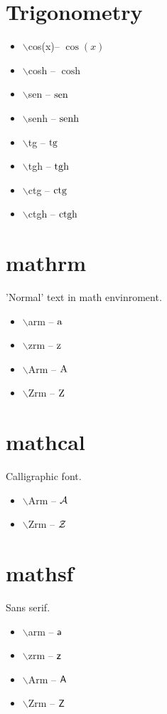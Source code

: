 \documentclass[twocolumn, a4paper]{article}
\begin{document}
	\section{Trigonometry}
	\begin{itemize}
		\item $\backslash$cos(x)-- $\cos(x)$ 
		\item $\backslash$cosh -- $\cosh$ 
		\item $\backslash$sen -- $\textrm{sen}$ 
		\item $\backslash$senh -- $\textrm{senh}$ 
		\item $\backslash$tg -- $\textrm{tg}$ 
		\item $\backslash$tgh -- $\textrm{tgh}$ 
		\item $\backslash$ctg -- $\textrm{ctg}$ 
		\item $\backslash$ctgh -- $\textrm{ctgh}$ 
	\end{itemize}
	
	\section{mathrm}
	'Normal' text in math envinroment.
	\begin{itemize}
		\item $\backslash$arm -- $\mathrm{a}$ 
		\item $\backslash$zrm -- $\mathrm{z}$ 
		\item $\backslash$Arm -- $\mathrm{A}$
		\item $\backslash$Zrm -- $\mathrm{Z}$  
	\end{itemize}
	
	\section{mathcal}
	Calligraphic font.
	\begin{itemize} 
		\item $\backslash$Arm -- $\mathcal{A}$
		\item $\backslash$Zrm -- $\mathcal{Z}$  
	\end{itemize}

	\section{mathsf}
	Sans serif.
	\begin{itemize} 
		\item $\backslash$arm -- $\mathsf{a}$
		\item $\backslash$zrm -- $\mathsf{z}$  
		\item $\backslash$Arm -- $\mathsf{A}$
		\item $\backslash$Zrm -- $\mathsf{Z}$  
	\end{itemize}
\end{document}
